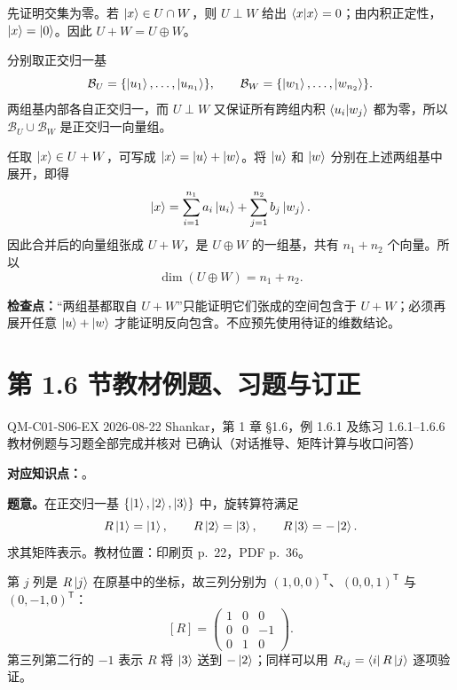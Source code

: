 \begin{checkedsolution}
先证明交集为零。若 $\left|x\right\rangle\in U\cap W$，则 $U\perp W$ 给出 $\left\langle x \middle| x \right\rangle=0$；由内积正定性，$\left|x\right\rangle=\left|0\right\rangle$。因此 $U+W=U\oplus W$。

分别取正交归一基
\[
  \mathcal B_U=\{\left|u_1\right\rangle,\ldots,\left|u_{n_1}\right\rangle\},
  \qquad
  \mathcal B_W=\{\left|w_1\right\rangle,\ldots,\left|w_{n_2}\right\rangle\}.
\]
两组基内部各自正交归一，而 $U\perp W$ 又保证所有跨组内积 $\left\langle u_i \middle| w_j \right\rangle$ 都为零，所以 $\mathcal B_U\cup\mathcal B_W$ 是正交归一向量组。

任取 $\left|x\right\rangle\in U+W$，可写成 $\left|x\right\rangle=\left|u\right\rangle+\left|w\right\rangle$。将 $\left|u\right\rangle$ 和 $\left|w\right\rangle$ 分别在上述两组基中展开，即得
\[
  \left|x\right\rangle=\sum_{i=1}^{n_1}a_i\left|u_i\right\rangle
  +\sum_{j=1}^{n_2}b_j\left|w_j\right\rangle.
\]
因此合并后的向量组张成 $U+W$，是 $U\oplus W$ 的一组基，共有 $n_1+n_2$ 个向量。所以
\[
  \dim(U\oplus W)=n_1+n_2.
\]
\end{checkedsolution}

\textbf{检查点：}“两组基都取自 $U+W$”只能证明它们张成的空间包含于 $U+W$；必须再展开任意 $\left|u\right\rangle+\left|w\right\rangle$ 才能证明反向包含。不应预先使用待证的维数结论。

\section{第 1.6 节教材例题、习题与订正}
\label{exercise-set:QM-C01-S06}

\exercisemeta
  {QM-C01-S06-EX}
  {2026-08-22}
  {Shankar，第 1 章 \S 1.6，例 1.6.1 及练习 1.6.1--1.6.6}
  {教材例题与习题全部完成并核对}
  {已确认（对话推导、矩阵计算与收口问答）}


\textbf{对应知识点：}。

\textbf{题意。}在正交归一基 $\{\left|1\right\rangle,\left|2\right\rangle,\left|3\right\rangle\}$ 中，旋转算符满足
\[
  R\left|1\right\rangle=\left|1\right\rangle,\qquad
  R\left|2\right\rangle=\left|3\right\rangle,\qquad
  R\left|3\right\rangle=-\left|2\right\rangle.
\]
求其矩阵表示。教材位置：印刷页 p.~22，PDF p.~36。

\begin{checkedsolution}
第 $j$ 列是 $R\left|j\right\rangle$ 在原基中的坐标，故三列分别为 $(1,0,0)^{\mathsf T}$、$(0,0,1)^{\mathsf T}$ 与 $(0,-1,0)^{\mathsf T}$：
\[
  [R]=\begin{pmatrix}1&0&0\\0&0&-1\\0&1&0\end{pmatrix}.
\]
第三列第二行的 $-1$ 表示 $R$ 将 $\left|3\right\rangle$ 送到 $-\left|2\right\rangle$；同样可以用 $R_{ij}=\left\langle i\right|R\left|j\right\rangle$ 逐项验证。
\end{checkedsolution}

